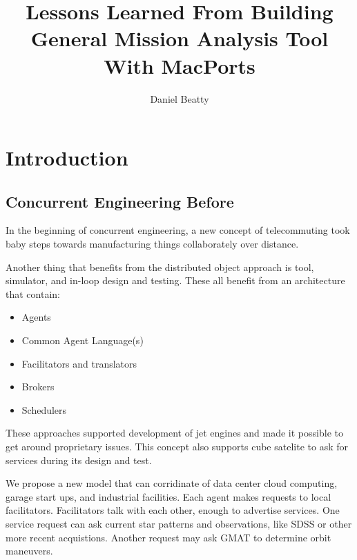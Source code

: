 \documentclass[
  a4paper, %
  11pt, %
  twoside,    %
  onecolumn,  %
  openright,  %
]{memoir}
\title{Lessons Learned From Building General Mission Analysis Tool With MacPorts}
\author{Daniel Beatty}
\begin{document}
\frontmatter

\maketitle

\begin{abstract}
\end{abstract}
\clearpage

\tableofcontents*
\clearpage

\chapter*[Intro Heading]{Introduction}


\section{Concurrent Engineering Before} %
\label{sec:concurrent_engineering_before}
In the beginning of concurrent engineering, a new concept of telecommuting took baby steps towards manufacturing things collaborately over distance.

Another thing that benefits from the distributed object approach is tool, simulator, and in-loop design and testing.   These all benefit from an architecture that contain:
\begin{itemize}

	\item Agents

	\item Common Agent Language(s)

	\item Facilitators and translators

	\item Brokers

	\item Schedulers

\end{itemize}


These approaches supported development of jet engines and made it possible to get around proprietary issues.  This concept also supports cube satelite to ask for services during its design and test.  

We propose a new model that can corridinate of data center cloud computing, garage start ups, and industrial facilities.  Each agent makes requests to local facilitators.  Facilitators talk with each other, enough to advertise services.  One service request can ask current star patterns and observations, like SDSS or other more recent acquistions.  Another request may ask GMAT to determine orbit maneuvers.  
\end{document}

